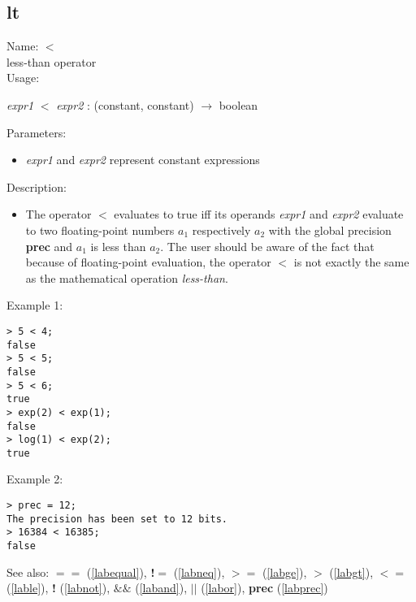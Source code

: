 \subsection{lt}
\label{lablt}
\noindent Name: \textbf{$<$}\\
less-than operator\\

\noindent Usage: 
\begin{center}
\emph{expr1} \textbf{$<$} \emph{expr2} : (\textsf{constant}, \textsf{constant}) $\rightarrow$ \textsf{boolean}\\
\end{center}
Parameters: 
\begin{itemize}
\item \emph{expr1} and \emph{expr2} represent constant expressions
\end{itemize}
\noindent Description: \begin{itemize}

\item The operator \textbf{$<$} evaluates to true iff its operands \emph{expr1} and
   \emph{expr2} evaluate to two floating-point numbers $a_1$
   respectively $a_2$ with the global precision \textbf{prec} and
   $a_1$ is less than $a_2$. The user should
   be aware of the fact that because of floating-point evaluation, the
   operator \textbf{$<$} is not exactly the same as the mathematical
   operation \emph{less-than}.
\end{itemize}
\noindent Example 1: 
\begin{center}\begin{minipage}{15cm}\begin{Verbatim}[frame=single]
> 5 < 4;
false
> 5 < 5;
false
> 5 < 6;
true
> exp(2) < exp(1);
false
> log(1) < exp(2);
true
\end{Verbatim}
\end{minipage}\end{center}
\noindent Example 2: 
\begin{center}\begin{minipage}{15cm}\begin{Verbatim}[frame=single]
> prec = 12;
The precision has been set to 12 bits.
> 16384 < 16385;
false
\end{Verbatim}
\end{minipage}\end{center}
See also: \textbf{$==$} (\ref{labequal}), \textbf{!$=$} (\ref{labneq}), \textbf{$>=$} (\ref{labge}), \textbf{$>$} (\ref{labgt}), \textbf{$<=$} (\ref{lable}), \textbf{!} (\ref{labnot}), \textbf{$\&\&$} (\ref{laband}), \textbf{$||$} (\ref{labor}), \textbf{prec} (\ref{labprec})
